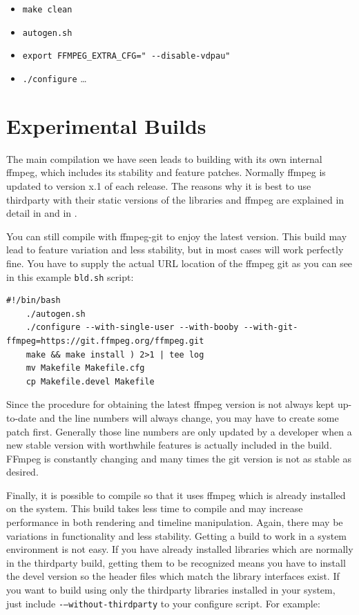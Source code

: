 \begin{itemize}[label={},nosep]
	\item \texttt{make clean}
	\item \texttt{autogen.sh}
	\item \texttt{export FFMPEG\_EXTRA\_CFG=" -{}-disable-vdpau"} 
	\item \texttt{./configure} {\dots}
\end{itemize}

\section{Experimental Builds}
\label{sec:experimental_builds}

The main compilation we have seen leads to building \CGG{} with its own internal ffmpeg, which includes its stability and feature patches. Normally ffmpeg is updated to version x.1 of each release. The reasons why it is best to use thirdparty with their static versions of the libraries and ffmpeg are explained in detail in  and in .

You can still compile \CGG{} with ffmpeg-git to enjoy the latest version. This build may lead to feature variation and less stability, but in most cases will work perfectly fine.
You have to supply the actual URL location of the ffmpeg git as you can see in this example \texttt{bld.sh} script:

\begin{lstlisting}[numbers=none]
	#!/bin/bash
	./autogen.sh
	./configure --with-single-user --with-booby --with-git-ffmpeg=https://git.ffmpeg.org/ffmpeg.git
	make && make install ) 2>1 | tee log
	mv Makefile Makefile.cfg
	cp Makefile.devel Makefile
\end{lstlisting}

Since the procedure for obtaining the latest ffmpeg version is not always kept up-to-date and the line numbers will always change, you may have to create some patch first. Generally those line numbers are only updated by a developer when a new stable version with worthwhile features is actually included in the \CGG{} build. FFmpeg is constantly changing and many times the git version is not as stable as desired.

Finally, it is possible to compile \CGG{} so that it uses ffmpeg which is already installed on the system. This build takes less time to compile and may increase performance in both rendering and timeline manipulation. Again, there may be variations in functionality and less stability.
Getting a build to work in a system environment is not easy. If you have already installed libraries which are normally in the thirdparty build, getting them to be recognized means you have to install the devel version
so the header files which match the library interfaces exist. If you want to build using only the thirdparty libraries installed in your system, just include \texttt{-–without-thirdparty} to your configure script. For example:

